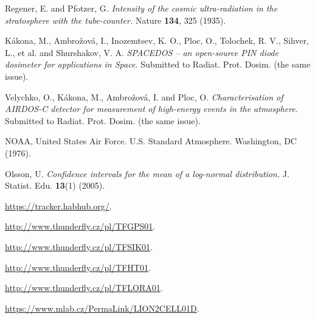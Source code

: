 \documentclass{Rpd}
\begin{document}
\begin{thebibliography}{99.}
 Regener, E. and Pfotzer, G. {\it Intensity of the cosmic ultra-radiation in the stratosphere with the tube-counter.} Nature {\bf 134}, 325 (1935).

 Kákona, M., Ambrožová, I., Inozemtsev, K. O., Ploc, O., Tolochek, R. V., Sihver, L., et al. and Shurshakov, V. A. {\it SPACEDOS – an open-source PIN diode dosimeter for applications in Space.} Submitted to Radiat. Prot. Dosim. (the same issue).

 Velychko, O., Kákona, M., Ambrožová, I. and Ploc, O. {\it Characterisation of AIRDOS-C detector for measurement of high-energy events in the atmosphere.} Submitted to Radiat. Prot. Dosim. (the same issue).

 NOAA, United States Air Force. U.S. Standard Atmosphere. Washington, DC (1976).

 Olsson, U. {\it Confidence intervals for the mean of a log-normal distribution.} J. Statist. Edu. {\bf 13}(1) (2005).

 \url{https://tracker.habhub.org/}.

  \url{http://www.thunderfly.cz/pl/TFGPS01}.

   \url{http://www.thunderfly.cz/pl/TFSIK01}.

  \url{http://www.thunderfly.cz/pl/TFHT01}.

  \url{http://www.thunderfly.cz/pl/TFLORA01}.

  \url{https://www.mlab.cz/PermaLink/LION2CELL01D}.



\end{thebibliography}
\end{document}
